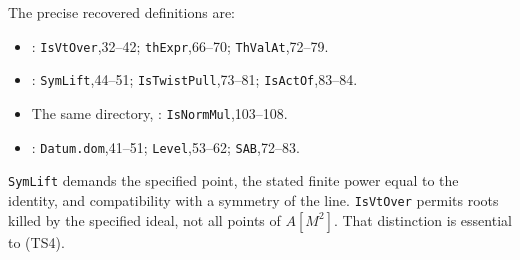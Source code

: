 \documentclass[11pt,a4paper]{article}
\theoremstyle{definition}\newtheorem{remark}[theorem]{Remark}
\begin{document}
The precise recovered definitions are:

\begin{itemize}
\item
  : \texttt{IsVtOver},32--42; \texttt{thExpr},66--70; \texttt{ThValAt},72--79.
\item
  : \texttt{SymLift},44--51; \texttt{IsTwistPull},73--81; \texttt{IsActOf},83--84.
\item
  The same directory, : \texttt{IsNormMul},103--108.
\item
  : \texttt{Datum.dom},41--51; \texttt{Level},53--62; \texttt{SAB},72--83.
\end{itemize}

\texttt{SymLift} demands the specified point, the stated finite power equal to the identity, and compatibility with a symmetry of the line. \texttt{IsVtOver} permits roots killed by the specified ideal, not all points of \(A[M^2]\). That distinction is essential to (TS4).
\end{document}
